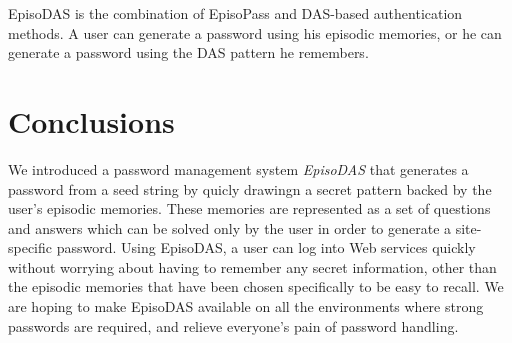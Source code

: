 \documentclass[sigconf]{acmart}
\begin{document}
EpisoDAS is the combination of EpisoPass and DAS-based authentication methods.
A user can generate a password using his episodic memories, or
he can generate a password using the DAS pattern he remembers.

\section{Conclusions}

We introduced a password management system \textit{EpisoDAS}
that generates a password from a seed string by
quicly drawingn a secret pattern backed by the user's episodic memories.
These memories are represented as a set of questions and answers
which can be solved only by the user in order to generate a site-specific password.
%
Using EpisoDAS, a user can log into Web services quickly without
worrying about
having to remember any secret information, other than the episodic memories
that have been chosen specifically to be easy to recall.
%
We are hoping to make EpisoDAS available on all the environments
where strong passwords are required, and
relieve everyone's pain of password handling.

\large


\end{document}
